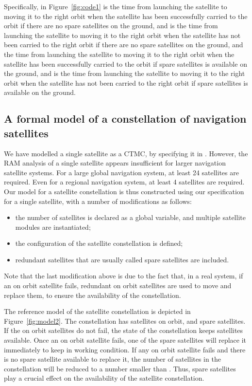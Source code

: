 \documentclass[preprint,12pt]{qrei}
\begin{document}
Specifically, in Figure~\ref{fig:code1}  is the time from launching the satellite to moving it to the right orbit when the satellite has been successfully carried to the orbit if there are no spare satellites on the ground, and  is the time from launching the satellite to moving it to the right orbit when the satellite has not been carried to the right orbit if there are no spare satellites on the ground, and  the time from launching the satellite to moving it to the right orbit when the satellite has been successfully carried to the orbit if spare satellites is available on the ground, and  is the time from launching the satellite to moving it to the right orbit when the satellite has not been carried to the right orbit if spare satellites is available on the ground.

\subsection{A formal model of a constellation of navigation satellites}

We have modelled a single satellite as a CTMC, by specifying it in . However, the RAM analysis of a single satellite appears insufficient for larger navigation satellite systems. For a large global navigation system, at least 24 satellites are required. Even for a regional navigation system, at least 4 satellites are required. Our  model for a satellite constellation is thus constructed using our specification for a single satellite, with a number of modifications as follows:

\begin{itemize}
\item the number of satellites is declared as a global variable, and multiple satellite modules are instantiated;
\item the configuration of the satellite constellation is defined;
\item redundant satellites that are usually called spare satellites are included.
\end{itemize}

Note that the last modification above is due to the fact that, in a real system, if an on orbit satellite fails, redundant on orbit satellites are used to move and replace them, to ensure the availability of the constellation.

The reference model of the satellite constellation is depicted in Figure~\ref{fig:model2}. The constellation has  satellites on orbit, and  spare satellites. If the on orbit satellites do not fail, the state of the constellation keeps  satellites available. Once an on orbit satellite fails, one of the spare satellites will replace it immediately to keep  in working condition. If any on orbit satellite fails and there is no spare satellite available to replace it, the number of satellites in the constellation will be reduced to a number smaller than . Thus, spare satellites play a crucial effect on the availability of the satellite constellation.
\end{document}
